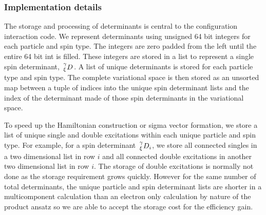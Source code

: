 \subsubsection{Implementation details}
The storage and processing of determinants is central to the configuration interaction code.
We represent determinants using unsigned 64 bit integers for each particle and spin type.
The integers are zero padded from the left until the entire 64 bit int is filled. These integers are stored in a list to represent a single spin determinant, $\shivten{\gamma}{\xi}{D}{}{}$.
A list of unique determinants is stored for each particle type and spin type.
The complete variational space is then stored as an unsorted map between a tuple of indices into the unique spin determinant lists and the index of the determinant made of those spin determinants in the variational space.

To speed up the Hamiltonian construction or sigma vector formation, we store a list of unique single and double excitations within each unique particle and spin type.
For example, for a spin determinant $\shivten{\gamma}{\xi}{D}{}{i}$, we store all connected singles in a two dimensional list in row $i$ and all connected double excitations in another two dimensional list in row $i$.
The storage of double excitations is normally not done as the storage requirement grows quickly.
However for the same number of total determinants, the unique particle and spin determinant lists are shorter in a multicomponent calculation than an electron only calculation by nature of the product ansatz so we are able to accept the storage cost for the efficiency gain.

